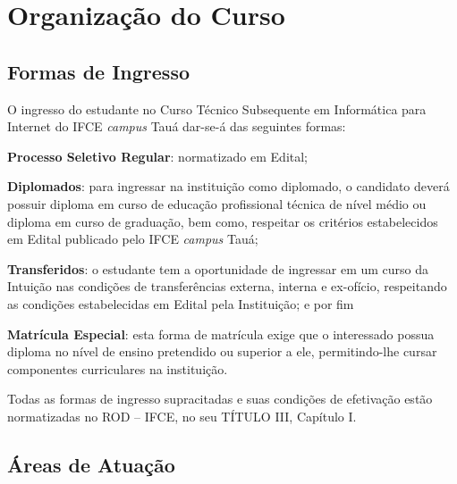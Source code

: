 \documentclass[
	12pt,				%
	openright,			%
	twoside,			%
	a4paper,			%
	chapter=TITLE,		%
	english,			%
	french,				%
	spanish,			%
	brazil,				%
	]{abntex2}
\begin{document}
\chapter{Organização do Curso}


\section{Formas de Ingresso}


O ingresso do estudante no Curso Técnico Subsequente em Informática para Internet do IFCE \textit{campus} Tauá dar-se-á das seguintes formas:

\begin{alineas}
    \item \textbf{Processo Seletivo Regular}: normatizado em Edital;
    
    \item \textbf{Diplomados}: para ingressar na instituição como diplomado, o candidato deverá possuir diploma em curso de educação profissional técnica de nível médio ou diploma em curso de graduação, bem como, respeitar os critérios estabelecidos em Edital publicado pelo IFCE \textit{campus} Tauá;
    
    \item \textbf{Transferidos}: o estudante tem a oportunidade de ingressar em um curso da Intuição nas condições de transferências externa, interna e ex-ofício, respeitando as condições estabelecidas em Edital pela Instituição; e por fim
    
    \item \textbf{Matrícula Especial}: esta forma de matrícula exige que o interessado possua diploma no nível de ensino pretendido ou superior a ele, permitindo-lhe cursar componentes curriculares na instituição.
\end{alineas}

Todas as formas de ingresso supracitadas e suas condições de efetivação estão normatizadas no  ROD -- IFCE, no seu TÍTULO III, Capítulo I.


\section{Áreas de Atuação}
\end{document}

